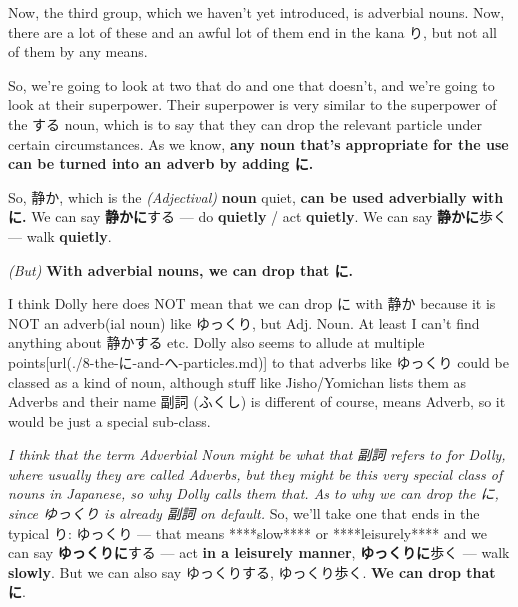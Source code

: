 \stopsectionlevel

\stopsectionlevel

\startsectionlevel[title={Fact 5},reference={fact-5}]

\startsectionlevel[title={Adverbial nouns},reference={adverbial-nouns}]

Now, the third group, which we haven't yet introduced, is adverbial nouns. Now, there are a lot of these and an awful lot of them end in the kana り, but not all of them by any means.

{}

So, we're going to look at two that do and one that doesn't, and we're going to look at their superpower. Their superpower is very similar to the superpower of the する noun, which is to say that they can drop the relevant particle under certain circumstances. As we know, {\bf any noun that's appropriate for the use can be turned into an adverb by adding に.}

So, 静か, which is the {\em (Adjectival)} {\bf noun} quiet, {\bf can be used adverbially with に.} We can say {\bf 静かに}する --- do {\bf quietly} / act {\bf quietly}. We can say {\bf 静かに}歩く --- walk {\bf quietly}.

\thinrule

{\em (But)} {\bf With adverbial nouns, we can drop that に.}

I think Dolly here does NOT mean that we can drop に with 静か because it is NOT an adverb(ial noun) like ゆっくり, but Adj. Noun. At least I can't find anything about 静かする etc. Dolly also seems to allude at multiple points\goto{{[}8{]}}[url(./8-the-に-and-へ-particles.md)] to that adverbs like ゆっくり could be classed as a kind of noun, although stuff like Jisho/Yomichan lists them as Adverbs and their name 副詞 (ふくし) is different of course, means Adverb, so it would be just a special sub-class.

{\em I think that the term Adverbial Noun might be what that 副詞 refers to for Dolly, where usually they are called Adverbs, but they might be this very special class of nouns in Japanese, so why Dolly calls them that. As to why we can drop the に, since ゆっくり is already 副詞 on default.} So, we'll take one that ends in the typical り: ゆっくり --- that means ****slow**** or ****leisurely**** and we can say {\bf ゆっくりに}する --- act {\bf in a leisurely manner}, {\bf ゆっくりに}歩く --- walk {\bf slowly}. But we can also say ゆっくりする, ゆっくり歩く. {\bf We can drop that に}.

